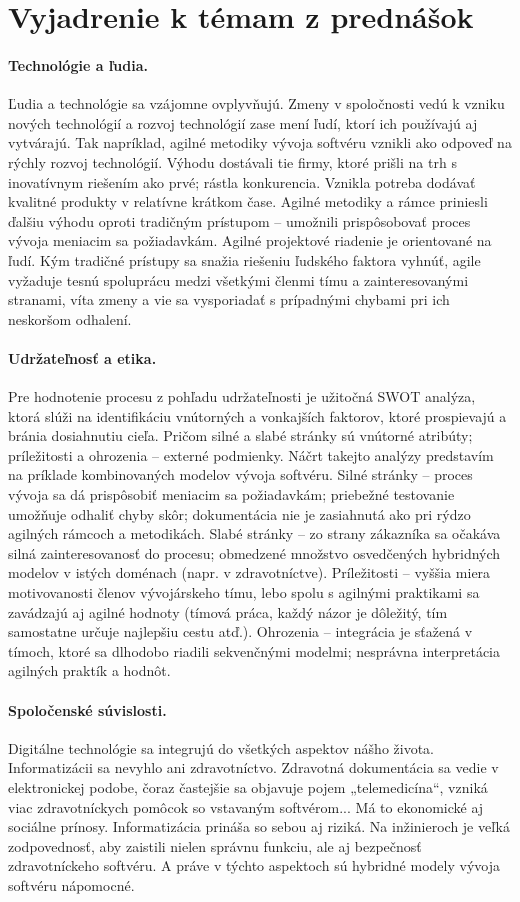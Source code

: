 \documentclass[10pt,twoside,slovak,a4paper]{article}
\begin{document}
\section{Vyjadrenie k témam z prednášok}
\paragraph{Technológie a ľudia.} 
Ľudia a technológie sa vzájomne ovplyvňujú. Zmeny v spoločnosti vedú k vzniku nových technológií a rozvoj technológií zase mení ľudí, ktorí ich používajú aj vytvárajú. Tak napríklad, agilné metodiky vývoja softvéru vznikli ako odpoveď na rýchly rozvoj technológií. Výhodu dostávali tie firmy, ktoré prišli na trh s inovatívnym riešením ako prvé; rástla konkurencia. Vznikla potreba dodávať kvalitné produkty v relatívne krátkom čase. Agilné metodiky a rámce priniesli ďalšiu výhodu oproti tradičným prístupom – umožnili prispôsobovať proces vývoja meniacim sa požiadavkám. Agilné projektové riadenie je orientované na ľudí. Kým tradičné prístupy sa snažia riešeniu ľudského faktora vyhnúť, agile vyžaduje tesnú spoluprácu medzi všetkými členmi tímu a zainteresovanými stranami, víta zmeny a vie sa vysporiadať s prípadnými chybami pri ich neskoršom odhalení.
\paragraph{Udržateľnosť a etika.}
Pre hodnotenie procesu z pohľadu udržateľnosti je užitočná SWOT analýza, ktorá slúži na identifikáciu vnútorných a vonkajších faktorov, ktoré prospievajú a bránia dosiahnutiu cieľa. Pričom silné a slabé stránky sú vnútorné atribúty; príležitosti a ohrozenia – externé podmienky. Náčrt takejto analýzy predstavím na príklade kombinovaných modelov vývoja softvéru. Silné stránky – proces vývoja sa dá prispôsobiť meniacim sa požiadavkám; priebežné testovanie umožňuje odhaliť chyby skôr; dokumentácia nie je zasiahnutá ako pri rýdzo agilných rámcoch a metodikách. Slabé stránky – zo strany zákazníka sa očakáva silná zainteresovanosť do procesu; obmedzené množstvo osvedčených hybridných modelov v istých doménach (napr. v zdravotníctve). Príležitosti – vyššia miera motivovanosti členov vývojárskeho tímu, lebo spolu s agilnými praktikami sa zavádzajú aj agilné hodnoty (tímová práca, každý názor je dôležitý, tím samostatne určuje najlepšiu cestu atď.). Ohrozenia – integrácia je sťažená v tímoch, ktoré sa dlhodobo riadili sekvenčnými modelmi; nesprávna interpretácia agilných praktík a hodnôt.
\paragraph{Spoločenské súvislosti.}
Digitálne technológie sa integrujú do všetkých aspektov nášho života. Informatizácii sa nevyhlo ani zdravotníctvo. Zdravotná dokumentácia sa vedie v elektronickej podobe, čoraz častejšie sa objavuje pojem „telemedicína“, vzniká viac zdravotníckych pomôcok so vstavaným softvérom... Má to ekonomické aj sociálne prínosy. Informatizácia prináša so sebou aj riziká. Na inžinieroch je veľká zodpovednosť, aby zaistili nielen správnu funkciu, ale aj bezpečnosť zdravotníckeho softvéru. A práve v týchto aspektoch sú hybridné modely vývoja softvéru nápomocné.
\end{document}
